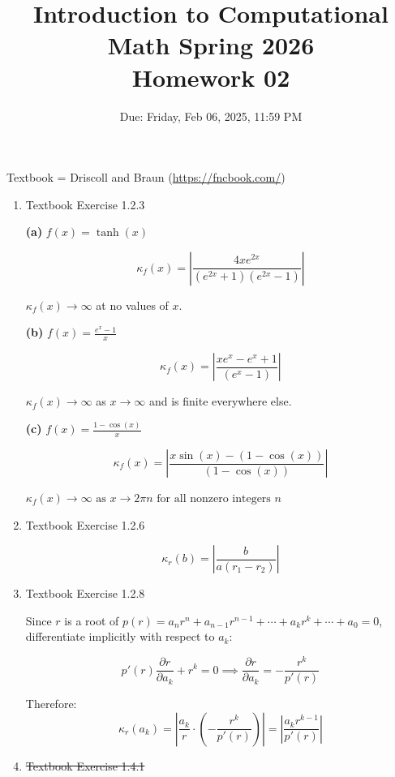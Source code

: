 \documentclass[reqno, answers]{exam}
\title{Introduction to Computational Math Spring 2026 \\ Homework 02}
\date{Due: Friday, Feb 06, 2025, 11:59 PM}
\author{}
\begin{document}
\maketitle
\thispagestyle{empty}

Textbook = Driscoll and Braun (\url{https://fncbook.com/})

\begin{enumerate}

\item Textbook Exercise 1.2.3

\begin{solution}

\textbf{(a)} $f(x) = \tanh(x)$

$$\kappa_f(x) = \left|\frac{4xe^{2x}}{(e^{2x} + 1)(e^{2x} - 1)}\right|$$

$\kappa_f(x) \to \infty$ at no values of $x$.

\textbf{(b)} $f(x) = \frac{e^x - 1}{x}$

$$\kappa_f(x) = \left|\frac{xe^x - e^x + 1}{(e^x - 1)}\right|$$

$\kappa_f(x) \to \infty$ as $x \to \infty$ and is finite everywhere else.

\textbf{(c)} $f(x) = \frac{1 - \cos(x)}{x}$

$$\kappa_f(x) = \left|\frac{x\sin(x) - (1-\cos(x))}{(1-\cos(x))}\right|$$

$\kappa_f(x) \to \infty \text{ as } x \to 2\pi n \text{ for all nonzero integers } n$

\end{solution}

\item Textbook Exercise 1.2.6
\begin{solution}
  
  $$\kappa_r(b) = \left|\frac{b}{a(r_1 - r_2)}\right|$$
  
\end{solution}

\item Textbook Exercise 1.2.8

\begin{solution}

Since $r$ is a root of $p(r) = a_n r^n + a_{n-1} r^{n-1} + \cdots + a_k r^k + \cdots + a_0 = 0$, differentiate implicitly with respect to $a_k$:

$$p'(r) \frac{\partial r}{\partial a_k} + r^k = 0 \implies \frac{\partial r}{\partial a_k} = -\frac{r^k}{p'(r)}$$

Therefore:
$$\kappa_r(a_k) = \left|\frac{a_k}{r} \cdot \left(-\frac{r^k}{p'(r)}\right)\right| = \left|\frac{a_k r^{k-1}}{p'(r)}\right|$$

\end{solution}

\item \sout{Textbook Exercise 1.4.1}


\end{enumerate}
\end{document}
